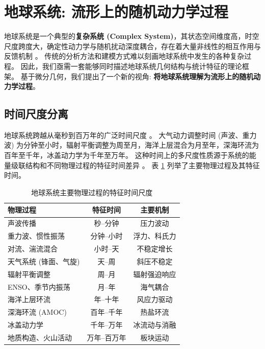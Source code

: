 \section{地球系统: 流形上的随机动力学过程}
\label{sec:earth_system}

地球系统是一个典型的\textbf{复杂系统 (Complex System)}，其状态空间维度高，时空尺度跨度大，确定性动力学与随机扰动深度耦合，存在着大量非线性的相互作用与反馈机制 \cite{wang2023earth}。
传统的分析方法和建模方式难以刻画地球系统中发生的各种复杂过程。
因此，我们亟需一套能够同时描述地球系统几何结构与统计特征的理论框架。
基于微分几何，我们提出了一个新的视角: \textbf{将地球系统理解为流形上的随机动力学过程}。

\subsection{时间尺度分离}
\label{sec:timescale_separation}

地球系统跨越从毫秒到百万年的广泛时间尺度 \cite{majda2012climate}。
大气动力调整时间 (声波、重力波) 为分钟至小时，辐射平衡调整为周至月，海洋上层混合为月至年，深海环流为百年至千年，冰盖动力学为千年至万年。
这种时间上的多尺度性质源于系统的能量级联结构和不同物理过程的特征时间差异 \cite{arnold1998random}。
表 \ref{tab:timescales} 列举了主要物理过程及其特征时间。

\begin{table}[htbp]
\centering
\caption{地球系统主要物理过程的特征时间尺度}
\label{tab:timescales}
\begin{tabular}{lcc}
    \hline
    物理过程 & 特征时间 & 主要机制 \\
    \hline
    声波传播 & 秒$\text{--}$分钟 & 压力波动 \\
    重力波、惯性振荡 & 分钟$\text{--}$小时 & 浮力、科氏力 \\
    对流、湍流混合 & 小时$\text{--}$天 & 不稳定增长 \\
    天气系统 (锋面、气旋) & 天$\text{--}$周 & 斜压不稳定 \\
    辐射平衡调整 & 周$\text{--}$月 & 辐射强迫响应 \\
    ENSO、季节内振荡 & 月$\text{--}$年 & 海气耦合 \\
    海洋上层环流 & 年$\text{--}$十年 & 风应力驱动 \\
    深海环流 (AMOC) & 百年$\text{--}$千年 & 热盐环流 \\
    冰盖动力学 & 千年$\text{--}$万年 & 冰流动与消融 \\
    地质构造、火山活动 & 万年$\text{--}$百万年 & 板块运动 \\
    \hline
\end{tabular}
\end{table}

